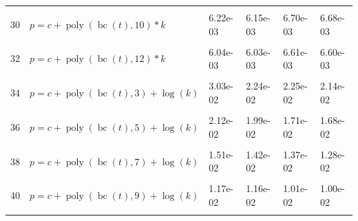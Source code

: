 \documentclass[12pt,a4paper]{article}
\DeclareMathOperator{\bc}{bc}
\DeclareMathOperator{\poly}{poly}
\begin{document}
\begin{longtable}[t]{ll>{\raggedleft\arraybackslash}p{2cm}>{\raggedleft\arraybackslash}p{2cm}>{\raggedleft\arraybackslash}p{2cm}>{\raggedleft\arraybackslash}p{2cm}}
\cellcolor{gray!6}{29} & \cellcolor{gray!6}{$p = c + \poly\left( \bc(t), 9 \right) * k$} & \cellcolor{gray!6}{6.86e-03} & \cellcolor{gray!6}{6.66e-03} & \cellcolor{gray!6}{7.30e-03} & \cellcolor{gray!6}{7.17e-03}\\
30 & $p = c + \poly\left( \bc(t), 10 \right) * k$ & 6.22e-03 & 6.15e-03 & 6.70e-03 & 6.68e-03\\
\cellcolor{gray!6}{31} & \cellcolor{gray!6}{$p = c + \poly\left( \bc(t), 11 \right) * k$} & \cellcolor{gray!6}{6.08e-03} & \cellcolor{gray!6}{6.06e-03} & \cellcolor{gray!6}{6.66e-03} & \cellcolor{gray!6}{6.64e-03}\\
32 & $p = c + \poly\left( \bc(t), 12 \right) * k$ & 6.04e-03 & 6.03e-03 & 6.61e-03 & 6.60e-03\\
\cellcolor{gray!6}{33} & \cellcolor{gray!6}{$p = c + \poly\left( \bc(t), 13 \right) * k$} & \cellcolor{gray!6}{5.99e-03} & \cellcolor{gray!6}{5.99e-03} & \cellcolor{gray!6}{6.59e-03} & \cellcolor{gray!6}{6.58e-03}\\
34 & $p = c + \poly\left( \bc(t), 3 \right) + \log(k)$ & 3.03e-02 & 2.24e-02 & 2.25e-02 & 2.14e-02\\
\cellcolor{gray!6}{35} & \cellcolor{gray!6}{$p = c + \poly\left( \bc(t), 4 \right) + \log(k)$} & \cellcolor{gray!6}{2.58e-02} & \cellcolor{gray!6}{2.36e-02} & \cellcolor{gray!6}{2.52e-02} & \cellcolor{gray!6}{2.39e-02}\\
36 & $p = c + \poly\left( \bc(t), 5 \right) + \log(k)$ & 2.12e-02 & 1.99e-02 & 1.71e-02 & 1.68e-02\\
\cellcolor{gray!6}{37} & \cellcolor{gray!6}{$p = c + \poly\left( \bc(t), 6 \right) + \log(k)$} & \cellcolor{gray!6}{1.59e-02} & \cellcolor{gray!6}{1.47e-02} & \cellcolor{gray!6}{1.29e-02} & \cellcolor{gray!6}{1.26e-02}\\
38 & $p = c + \poly\left( \bc(t), 7 \right) + \log(k)$ & 1.51e-02 & 1.42e-02 & 1.37e-02 & 1.28e-02\\
\cellcolor{gray!6}{39} & \cellcolor{gray!6}{$p = c + \poly\left( \bc(t), 8 \right) + \log(k)$} & \cellcolor{gray!6}{1.20e-02} & \cellcolor{gray!6}{1.17e-02} & \cellcolor{gray!6}{1.00e-02} & \cellcolor{gray!6}{9.97e-03}\\
40 & $p = c + \poly\left( \bc(t), 9 \right) + \log(k)$ & 1.17e-02 & 1.16e-02 & 1.01e-02 & 1.00e-02\\
\cellcolor{gray!6}{41} & \cellcolor{gray!6}{$p = c + \poly\left( \bc(t), 10 \right) + \log(k)$} & \cellcolor{gray!6}{1.15e-02} & \cellcolor{gray!6}{1.14e-02} & \cellcolor{gray!6}{9.76e-03} & \cellcolor{gray!6}{9.71e-03}\\

\end{longtable}
\end{document}
